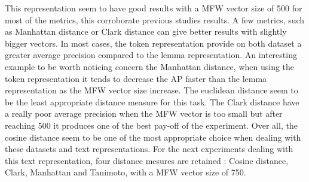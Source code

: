 This representation seem to have good results with a MFW vector size of 500 for most of the metrics, this corroborate previous studies results.
A few metrics, such as Manhattan distance or Clark distance can give better results with slightly bigger vectors.
In most cases, the token representation provide on both dataset a greater average precision compared to the lemma representation.
An interesting example to be worth noticing concern the Manhattan distance, when using the token representation it tends to decrease the AP faster than the lemma representation as the MFW vector size increase.
The euclidean distance seem to be the least appropriate distance measure for this task.
The Clark distance have a really poor average precision when the MFW vector is too small but after reaching 500 it produces one of the best pay-off of the experiment.
Over all, the cosine distance seem to be one of the most appropriate choice when dealing with these datasets and text representations.
For the next experiments dealing with this text representation, four distance mesures are retained : Cosine distance, Clark, Manhattan and Tanimoto, with a MFW vector size of 750.

